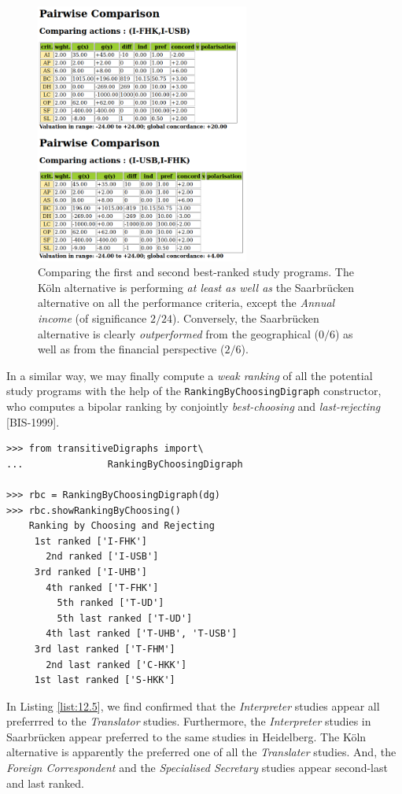 \begin{figure}[h]
\sidecaption
\includegraphics[width=7cm]{Figures/pairwiseComparison.png}
\caption{Comparing the first and second best-ranked study programs. The Köln alternative is performing \emph{at least as well as} the Saarbrücken alternative on all the performance criteria, except the \emph{Annual income} (of significance $2/24$). Conversely, the Saarbrücken alternative is clearly \emph{outperformed} from the geographical ($0/6$) as well as from the financial perspective ($2/6$).
}
\label{fig:12.6}       %
\end{figure}
\clearpage

In a similar way, we may finally compute a \emph{weak ranking} of all the potential study programs with the help of the \texttt{RankingByChoosingDigraph} constructor, who computes a bipolar ranking by conjointly \emph{best-choosing} and \emph{last-rejecting} [BIS-1999].

\begin{lstlisting}[caption={Weakly ranking by bipolar best-choosing and last-rejecting},label=list:12.5]
>>> from transitiveDigraphs import\
...               RankingByChoosingDigraph

>>> rbc = RankingByChoosingDigraph(dg)
>>> rbc.showRankingByChoosing()
    Ranking by Choosing and Rejecting
     1st ranked ['I-FHK'] 
       2nd ranked ['I-USB']
	 3rd ranked ['I-UHB']
	   4th ranked ['T-FHK']
	     5th ranked ['T-UD']
	     5th last ranked ['T-UD']
	   4th last ranked ['T-UHB', 'T-USB']
	 3rd last ranked ['T-FHM']
       2nd last ranked ['C-HKK']
     1st last ranked ['S-HKK']
\end{lstlisting}

In Listing \ref{list:12.5}, we find confirmed that the \emph{Interpreter} studies appear all preferrred to the \emph{Translator} studies. Furthermore, the \emph{Interpreter} studies in Saarbrücken appear preferred to the same studies in Heidelberg. The Köln alternative is apparently the preferred one of all the \emph{Translater} studies. And, the \emph{Foreign Correspondent} and the \emph{Specialised Secretary} studies appear second-last and last ranked.

